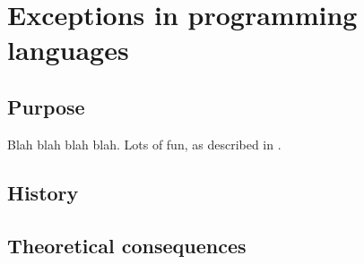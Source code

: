 \chapter{Exceptions in programming languages}

\section{Purpose}

Blah blah blah blah. Lots of fun, as described in \cite{swierstra:thesis}.

\section{History}

\section{Theoretical consequences}

